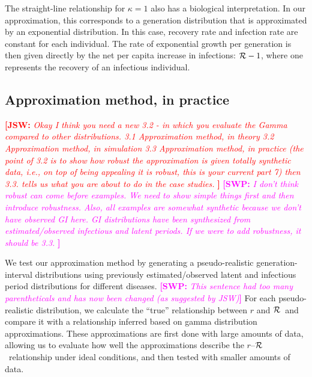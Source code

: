 \documentclass[12pt]{article}
\newcommand{\rR}{\mbox{$r$--$\cal R$}}
\newcommand{\RR}{\ensuremath{{\cal R}}}
\newcommand{\comment}[3]{\textcolor{#1}{\textbf{[#2: }\textit{#3}\textbf{]}}}
\newcommand{\swp}[1]{\comment{magenta}{SWP}{#1}}
\newcommand{\jsw}[1]{\comment{red}{JSW}{#1}}
\begin{document}
The straight-line relationship for $\kappa=1$ also has a biological interpretation. 
In our approximation, this corresponds to a generation distribution that is approximated by an exponential distribution. 
In this case, recovery rate and infection rate are constant for each individual.
The rate of exponential growth per generation is then given directly by the net per capita increase in infections: $\RR-1$, where one represents the recovery of an infectious individual. 

\subsection{Approximation method, in practice}

\jsw{
Okay I think you need a new 3.2 - in which you evaluate the Gamma compared to other distributions.
3.1 Approximation method, in theory
3.2 Approximation method, in simulation
3.3 Approximation method, in practice
(the point of 3.2 is to show how robust the approximation is given totally synthetic data, i.e., on top of being appealing it is robust, this is your current part 7)
then 3.3. tells us what you are about to do in the case studies.
}
\swp{
I don't think robust can come before examples. 
We need to show simple things first and then introduce robustness.
Also, all examples are somewhat synthetic because we don't have observed GI here. 
GI distributions have been synthesized from estimated/observed infectious and latent periods.
If we were to add robustness, it should be 3.3.
}

We test our approximation method by generating a pseudo-realistic generation-interval distributions using previously estimated/observed latent and infectious period distributions for different diseases.
\swp{This sentence had too many parentheticals and has now been changed (as suggested by JSW)}
For each pseudo-realistic distribution, we calculate the ``true'' relationship between $r$ and \RR\ and compare it with a relationship inferred based on gamma distribution approximations. 
These approximations are first done with large amounts of data, allowing us to evaluate how well the approximations describe the \rR\ relationship under ideal conditions, and then tested with smaller amounts of data. 
\end{document}
